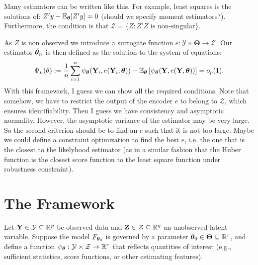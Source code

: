 \documentclass[twoside,11pt]{article}
\begin{document}
Many estimators can be written like this. 
For example, least squares is the solutions of: $Z'y - \mathbb{E}_{\bm{\theta}}[Z'y]= 0$ (should we specify moment estimators?).
Furthermore, the condition is that $\mathcal{Z}= \{ Z: Z'Z \text{ is non-singular} \}$.

As $Z$ is non observed we introduce a surrogate function
$e : \mathcal{Y} \times \bm{\Theta} \to \mathcal{Z}$.
Our estimator $\hat{{\bm{\theta}}}_n$ is then defined as the solution to the system of equations:
\begin{equation}
\Psi_n(\theta) := \frac{1}{n} \sum_{i=1}^n \psi_{\bm{\theta}}({\bf Y}_i, e({\bf Y}_i, {\bm{\theta}})) 
-
\mathbb{E}_{\bm{\theta}}
\left[ 
\psi_{\bm{\theta}}({\bf Y}, e({\bf Y}, {\bm{\theta}})) 
\right] = o_p(1).
\end{equation}
{\color{red} With this framework, I guess we can show all the required conditions.
Note that somehow, we have to restrict the output of the encoder $e$ to belong to $\mathcal{Z}$, which ensures identifiability.
}
Then I guess we have consistency and asymptotic normality.
However, the asymptotic variance of the estimator may be very large.
So the second criterion should be to find an $e$ such that it is not too large.
Maybe we could define a constraint optimization to find the best $e$, i.e. the one that is the closest to the likelyhood estimator (as in a similar fashion that the Huber function is the closest score function to the least square function under robustness constraint).


\section{The Framework}

Let ${\bf Y} \in \mathcal{Y} \subseteq \mathbb{R}^p$ be observed data and ${\bf Z} \in \mathcal{Z} \subseteq \mathbb{R}^q$ an unobserved latent variable. Suppose the model $F_{{\bm{\theta}}_0}$ is governed by a parameter ${\bm{\theta}}_0 \in \bm{\Theta} \subseteq \mathbb{R}^r$, and define a function $\psi_{\bm{\theta}} : \mathcal{Y} \times \mathcal{Z} \to \mathbb{R}^r$ that reflects quantities of interest (e.g., sufficient statistics, score functions, or other estimating features).

\end{document}
